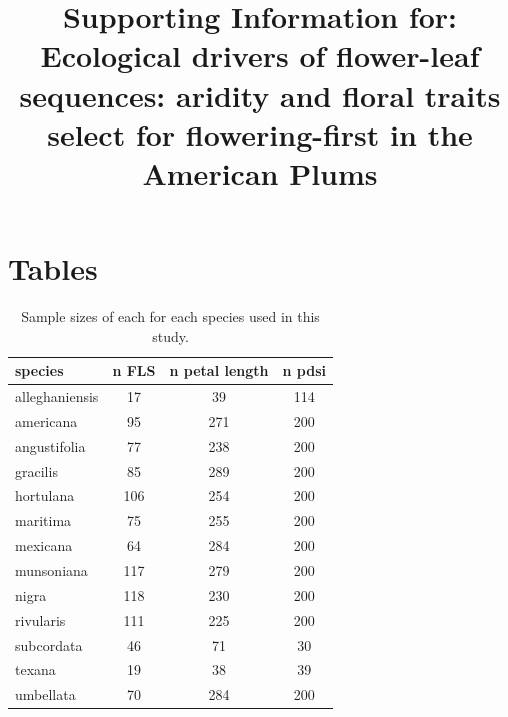 \documentclass{article}[11pt]
\title{Supporting Information for: Ecological drivers of flower-leaf sequences: aridity and floral traits select for flowering-first in the American Plums}
\date{}
\begin{document}

\maketitle

\section*{Tables}
\begin{table}[ht]
\centering
\begin{tabular}{|lccc|}
  \hline
  species & n FLS & n petal length & n pdsi \\ 
  \hline
 alleghaniensis &  17 &  39 & 114 \\ 
americana &  95 & 271 & 200 \\ 
angustifolia &  77 & 238 & 200 \\ 
 gracilis &  85 & 289 & 200 \\ 
 hortulana & 106 & 254 & 200 \\ 
  maritima &  75 & 255 & 200 \\ 
  mexicana &  64 & 284 & 200 \\ 
  munsoniana & 117 & 279 & 200 \\ 
 nigra & 118 & 230 & 200 \\ 
   rivularis & 111 & 225 & 200 \\ 
   subcordata &  46 &  71 &  30 \\ 
   texana &  19 &  38 &  39 \\ 
  umbellata &  70 & 284 & 200 \\ 
   \hline
\end{tabular}
\caption{Sample sizes of each for each species used in this study.}
\label{tab:samps}
\end{table}
\end{document}
